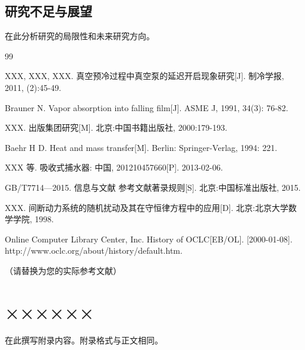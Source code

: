 \documentclass[12pt, a4paper, openany]{ctexbook}
\renewcommand{\chaptermark}[1]{\markboth{第\thechapter 章\quad #1}{}}
\renewcommand{\chaptermark}[1]{\markboth{第\thechapter 章\quad #1}{}}
\begin{document}
\section{研究不足与展望}

在此分析研究的局限性和未来研究方向。

\backmatter

\chaptermark{参考文献}

% 

\begin{thebibliography}{99}
\setlength{\itemsep}{0pt}  %
\setlength{\parskip}{0pt}
\setlength{\parsep}{0pt}

XXX, XXX, XXX.
真空预冷过程中真空泵的延迟开启现象研究[J].
制冷学报, 2011, (2):45-49.

Brauner N.
Vapor absorption into falling film[J].
ASME J, 1991, 34(3): 76-82.

XXX.
出版集团研究[M].
北京:中国书籍出版社, 2000:179-193.

Baehr H D.
Heat and mass transfer[M].
Berlin: Springer-Verlag, 1994: 221.

XXX 等.
吸收式捕水器: 中国, 201210457660[P].
2013-02-06.

GB/T7714---2015.
信息与文献 参考文献著录规则[S].
北京:中国标准出版社, 2015.

XXX.
间断动力系统的随机扰动及其在守恒律方程中的应用[D].
北京:北京大学数学学院, 1998.

Online Computer Library Center, Inc.
History of OCLC[EB/OL].
[2000-01-08]. http://www.oclc.org/about/history/default.htm.

（请替换为您的实际参考文献）

\end{thebibliography}

\appendix
\chapter{××××××}

在此撰写附录内容。附录格式与正文相同。
\end{document}
